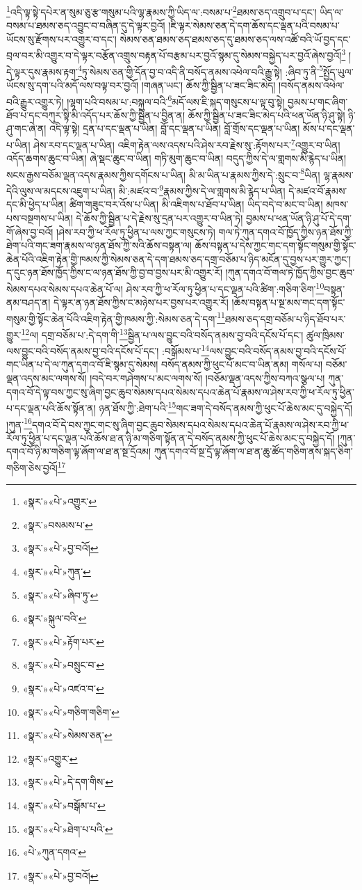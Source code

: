 \footnote{«སྣར་»«པེ་»འགྱུར་}འདི་ལྟ་སྟེ་དཔེར་ན་སུམ་ཅུ་རྩ་གསུམ་པའི་ལྷ་རྣམས་ཀྱི་ཡིད་ལ་:བསམ་པ་\footnote{«སྣར་»བསམས་པ་}ཐམས་ཅད་འགྲུབ་པ་དང་། ཡིད་ལ་བསམ་པ་ཐམས་ཅད་འབྱུང་བ་བཞིན་དུ་དེ་ལྟར་བྱའོ། །ཇི་ལྟར་སེམས་ཅན་དེ་དག་ཆོས་དང་ལྡན་པའི་བསམ་པ་ཡོངས་སུ་རྫོགས་པར་འགྱུར་བ་དང་། སེམས་ཅན་ཐམས་ཅད་ཐམས་ཅད་དུ་ཐམས་ཅད་ལས་འཚོ་བའི་ཡོ་བྱད་དང་བྲལ་བར་མི་འགྱུར་བ་དེ་ལྟར་བརྩོན་འགྲུས་བརྟན་པོ་བརྩམ་པར་བྱའོ་སྙམ་དུ་སེམས་བསྐྱེད་པར་བྱའོ་ཞེས་བྱའོ།\footnote{«སྣར་»«པེ་»བྱ་བའོ།} །དེ་ལྟར་དུས་རྣམས་རྟག་\footnote{«སྣར་»«པེ་»ཀུན་}ཏུ་སེམས་ཅན་གྱི་དོན་བྱ་བ་འདི་ནི་བསོད་ནམས་འཕེལ་བའི་རྒྱུ་སྟེ། :ཞིབ་ཏུ་ནི་\footnote{«སྣར་»«པེ་»ཞིབ་ཏུ་}སྤྱོད་ཡུལ་ཡོངས་སུ་དག་པའི་མདོ་ལས་བལྟ་བར་བྱའོ། །གཞན་ཡང་། ཆོས་ཀྱི་སྦྱིན་པ་ཟང་ཟིང་མེད། །བསོད་ནམས་འཕེལ་བའི་རྒྱུར་འགྱུར་ཏེ། །ལྷག་པའི་བསམ་པ་:བསྐུལ་བའི་\footnote{«སྣར་»སྐུལ་བའི་}མདོ་ལས་ཇི་སྐད་གསུངས་པ་ལྟ་བུ་སྟེ། བྱམས་པ་གང་ཞིག་ཐོབ་པ་དང་བཀུར་སྟི་མི་འདོད་པར་ཆོས་ཀྱི་སྦྱིན་པ་བྱིན་ན། ཆོས་ཀྱི་སྦྱིན་པ་ཟང་ཟིང་མེད་པའི་ཕན་ཡོན་ཉི་ཤུ་སྟེ། ཉི་ཤུ་གང་ཞེ་ན། འདི་ལྟ་སྟེ། དྲན་པ་དང་ལྡན་པ་ཡིན། བློ་དང་ལྡན་པ་ཡིན། བློ་གྲོས་དང་ལྡན་པ་ཡིན། མོས་པ་དང་ལྡན་པ་ཡིན། ཤེས་རབ་དང་ལྡན་པ་ཡིན། འཇིག་རྟེན་ལས་འདས་པའི་ཤེས་རབ་རྗེས་སུ་:རྟོགས་པར་\footnote{«སྣར་»«པེ་»རྟོག་པར་}འགྱུར་བ་ཡིན། འདོད་ཆགས་ཆུང་བ་ཡིན། ཞེ་སྡང་ཆུང་བ་ཡིན། གཏི་མུག་ཆུང་བ་ཡིན། བདུད་ཀྱིས་དེ་ལ་གླགས་མི་རྙེད་པ་ཡིན། སངས་རྒྱས་བཅོམ་ལྡན་འདས་རྣམས་ཀྱིས་དགོངས་པ་ཡིན། མི་མ་ཡིན་པ་རྣམས་ཀྱིས་དེ་:སྲུང་བ་\footnote{«སྣར་»«པེ་»བསྲུང་བ་}ཡིན། ལྷ་རྣམས་དེའི་ལུས་ལ་མདངས་འཇུག་པ་ཡིན། མི་:མཛའ་བ་\footnote{«སྣར་»«པེ་»འཛའ་བ་}རྣམས་ཀྱིས་དེ་ལ་གླགས་མི་རྙེད་པ་ཡིན། དེ་མཛའ་བོ་རྣམས་དང་མི་ཕྱེད་པ་ཡིན། ཚིག་གཟུང་བར་འོས་པ་ཡིན། མི་འཇིགས་པ་ཐོབ་པ་ཡིན། ཡིད་བདེ་བ་མང་བ་ཡིན། མཁས་པས་བསྔགས་པ་ཡིན། དེ་ཆོས་ཀྱི་སྦྱིན་པ་དེ་རྗེས་སུ་དྲན་པར་འགྱུར་བ་ཡིན་ཏེ། བྱམས་པ་ཕན་ཡོན་ཉི་ཤུ་པོ་དེ་དག་གོ་ཞེས་བྱ་བའོ། །ཤེས་རབ་ཀྱི་ཕ་རོལ་ཏུ་ཕྱིན་པ་ལས་ཀྱང་གསུངས་ཏེ། གལ་ཏེ་ཀུན་དགའ་བོ་ཁྱོད་ཀྱིས་ཉན་ཐོས་ཀྱི་ཐེག་པའི་གང་ཟག་རྣམས་ལ་ཉན་ཐོས་ཀྱི་སའི་ཆོས་བསྟན་ལ། ཆོས་བསྟན་པ་དེས་ཀྱང་གང་དག་སྟོང་གསུམ་གྱི་སྟོང་ཆེན་པོའི་འཇིག་རྟེན་གྱི་ཁམས་ཀྱི་སེམས་ཅན་དེ་དག་ཐམས་ཅད་དགྲ་བཅོམ་པ་ཉིད་མངོན་དུ་བྱས་པར་གྱུར་ཀྱང་། ད་དུང་ཉན་ཐོས་ཁྱོད་ཀྱིས་ང་ལ་ཉན་ཐོས་ཀྱི་བྱ་བ་བྱས་པར་མི་འགྱུར་རོ། །ཀུན་དགའ་བོ་གལ་ཏེ་ཁྱོད་ཀྱིས་བྱང་ཆུབ་སེམས་དཔའ་སེམས་དཔའ་ཆེན་པོ་ལ། ཤེས་རབ་ཀྱི་ཕ་རོལ་ཏུ་ཕྱིན་པ་དང་ལྡན་པའི་ཚིག་:གཅིག་ཅིག་\footnote{«སྣར་»«པེ་»གཅིག་གཅིག་}བསྟན་ནམ་བཤད་ན། དེ་ལྟར་ན་ཉན་ཐོས་ཀྱིས་ང་མཉེས་པར་བྱས་པར་འགྱུར་རོ། །ཆོས་བསྟན་པ་སྔ་མས་གང་དག་སྟོང་གསུམ་གྱི་སྟོང་ཆེན་པོའི་འཇིག་རྟེན་གྱི་ཁམས་ཀྱི་:སེམས་ཅན་དེ་དག་\footnote{«སྣར་»«པེ་»སེམས་ཅན་}ཐམས་ཅད་དགྲ་བཅོམ་པ་ཉིད་ཐོབ་པར་གྱུར་\footnote{«སྣར་»འགྱུར་}ལ། དགྲ་བཅོམ་པ་:དེ་དག་གི་\footnote{«སྣར་»«པེ་»དེ་དག་གིས་}སྦྱིན་པ་ལས་བྱུང་བའི་བསོད་ནམས་བྱ་བའི་དངོས་པོ་དང་། ཚུལ་ཁྲིམས་ལས་བྱུང་བའི་བསོད་ནམས་བྱ་བའི་དངོས་པོ་དང་། :བསྒོམས་པ་\footnote{«སྣར་»«པེ་»བསྒོམ་པ་}ལས་བྱུང་བའི་བསོད་ནམས་བྱ་བའི་དངོས་པོ་གང་ཡིན་པ་དེ་ལ་ཀུན་དགའ་བོ་ཇི་སྙམ་དུ་སེམས། བསོད་ནམས་ཀྱི་ཕུང་པོ་མང་བ་ཡིན་ནམ། གསོལ་པ། བཅོམ་ལྡན་འདས་མང་ལགས་སོ། །བདེ་བར་གཤེགས་པ་མང་ལགས་སོ། །བཅོམ་ལྡན་འདས་ཀྱིས་བཀའ་སྩལ་པ། ཀུན་དགའ་བོ་དེ་ལྟ་བས་ཀྱང་སུ་ཞིག་བྱང་ཆུབ་སེམས་དཔའ་སེམས་དཔའ་ཆེན་པོ་རྣམས་ལ་ཤེས་རབ་ཀྱི་ཕ་རོལ་ཏུ་ཕྱིན་པ་དང་ལྡན་པའི་ཆོས་སྟོན་ན། ཉན་ཐོས་ཀྱི་:ཐེག་པའི་\footnote{«སྣར་»«པེ་»ཐེག་པ་པའི་}གང་ཟག་དེ་བསོད་ནམས་ཀྱི་ཕུང་པོ་ཆེས་མང་དུ་བསྐྱེད་དོ། །ཀུན་\footnote{«པེ་»ཀུན་དགའ་}དགའ་བོ་དེ་བས་ཀྱང་གང་སུ་ཞིག་བྱང་ཆུབ་སེམས་དཔའ་སེམས་དཔའ་ཆེན་པོ་རྣམས་ལ་ཤེས་རབ་ཀྱི་ཕ་རོལ་ཏུ་ཕྱིན་པ་དང་ལྡན་པའི་ཆོས་ཐ་ན་ཉི་མ་གཅིག་སྟོན་ན་དེ་བསོད་ནམས་ཀྱི་ཕུང་པོ་ཆེས་མང་དུ་བསྐྱེད་དོ། །ཀུན་དགའ་བོ་ཉི་མ་གཅིག་ལྟ་ཞོག་ལ་ཐ་ན་སྔ་དྲོའམ། ཀུན་དགའ་བོ་སྔ་དྲོ་ལྟ་ཞོག་ལ་ཐ་ན་ཆུ་ཚོད་གཅིག་ནས་སྐད་ཅིག་གཅིག་ཅེས་བྱའོ།\footnote{«སྣར་»«པེ་»བྱ་བའོ།} 